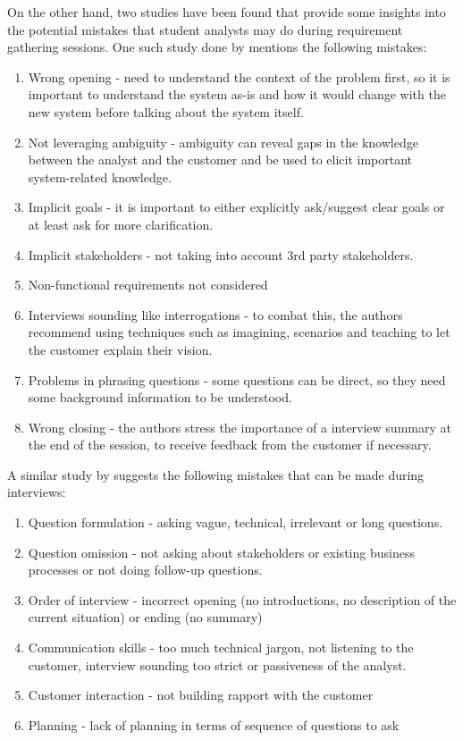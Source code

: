 On the other hand, two studies have been found that provide some insights into the potential mistakes that student analysts may do during requirement gathering sessions. One such study done by \textcite{interviews1} mentions the following mistakes:
\begin{enumerate}
    \item Wrong opening - need to understand the context of the problem first, so it is important to understand the system as-is and how it would change with the new system before talking about the system itself.
    \item Not leveraging ambiguity - ambiguity can reveal gaps in the knowledge between the analyst and the customer and be used to elicit important system-related knowledge.
    \item Implicit goals - it is important to either explicitly ask/suggest clear goals or at least ask for more clarification.
    \item Implicit stakeholders - not taking into account 3rd party stakeholders.
    \item Non-functional requirements not considered
    \item Interviews sounding like interrogations - to combat this, the authors recommend using techniques such as imagining, scenarios and teaching to let the customer explain their vision.
    \item Problems in phrasing questions - some questions can be direct, so they need some background information to be understood.
    \item Wrong closing - the authors stress the importance of a interview summary at the end of the session, to receive feedback from the customer if necessary.
\end{enumerate}

A similar study by \textcite{interviews2} suggests the following mistakes that can be made during interviews:

\begin{enumerate}
    \item Question formulation - asking vague, technical, irrelevant or long questions.
    \item Question omission - not asking about stakeholders or existing business processes or not doing follow-up questions.
    \item Order of interview - incorrect opening (no introductions, no description of the current situation) or ending (no summary)
    \item Communication skills - too much technical jargon, not listening to the customer, interview sounding too strict or passiveness of the analyst.
    \item Customer interaction - not building rapport with the customer
    \item Planning - lack of planning in terms of sequence of questions to ask
\end{enumerate}

